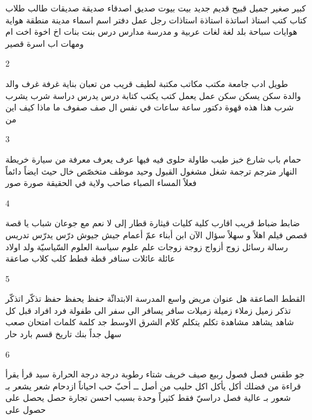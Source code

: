 \documentclass[twocolumn,a4paper]{article}
\begin{document}
\renewcommand*{\arraystretch}{3}
\setlength\tabcolsep{1pt}
\textarabic{
 كبير  
 صغير  
 جميل  
 قبيح  
 قديم  
 جديد  
 بيت  بيوت  
 صديق  اصدقاء  
 صديقة  صديقات 
 طالب  طلاب  
 كتاب  كتب  
 استاذ  اساتذة  
 استاذة  استاذات 
 رجل  
 عمل  
 دفتر  
 اسم  اسماء  
 مدينة  
 منطقة  
 هواية  هوايات 
 سباحة  
 بلد  
 لغة  لغات 
 عربية  
 و  
 مدرسة  مدارس  
 درس  
 بنت  بنات  
 اخ  اخوة  
 اخت  
 ام  ومهات 
 اب  
 اسرة  
 قصير  
}

2

\textarabic{ طويل  
 ادب  
 جامعة  
 مكتب  مكاتب  
 مكتبة  
 لطيف  
 قريب من  
 تعبان  
 بناية  
 غرفة  غرف  
 والد 
 والدة  
 سكن  يسكن  
 سكن  
 عمل  يعمل  
 كتب  يكتب  
 كتابة  
 درس  يدرس  
 دراسة  
 شرب  يشرب  
 شرب  
 هذا  
 هذه  
 قهوة  
 دكتور  
 ساعة  ساعات 
 في  
 نفس ال  
 صف  صفوف  
 ما  
 ماذا  
 كيف  
 اين  
 من  
}

3

\textarabic{ حمام  
 باب  
 شارع  
 خبز  
 طيب  
 طاولة  
 حلوى  
 فيه   
 فيها  
 عرف  يعرف   
 معرفة  
 من  
 سيارة  
 خريطة  
 النهار  
 مترجم  
 ترجمة  
 شغل  
 مشغول  
 القبول  
 وحيد  
 موظف  
 متخصّص  
 خال  
 حيث  
 ايضاً  
 دائماً  
 فعلاً  
 المساء  
 الصباء  
 صاحب  
 وﻻية  
 في الحقيقة  
 صورة  صور  
}

4

\textarabic{ ضابط  ضباط  
 قريب  اقارب  
 كلية  كليات  
 قيثارة  
 قطار  
 إلى  
 لا  
 نعم  
 مع  
 جوعان  
 شباب  
 يا  
 قصة  قصص  
 فيلم  
 اهلاً و سهلاً  
 سؤال  
 اﻵن  
 ابن  أبناء  
 عمّ  أعمام  
 جيش  جيوش  
 درّس  يدرّس  
 تدريس  
 رسالة  رسائل  
 زوج  أزواج  
 زوجة  زوجات 
 علم  علوم  
 سياسة  
 العلوم السّياسيّة  
 ولد  اولاد  
 عائلة  عائلات 
 سنافر  
 قطة  قطط  
 كلب  كلاب   
 صاعقة  
}

5

\textarabic{ القطط الصاعقة  
 هل  
 عنوان  
 مريض  
 واسع  
 المدرسة الابتدائّة  
 حفظ  يحفظ  
 حفظ  
 تذكّر  اتذكّر  
 تذكر  
 زميل  زملاء  
 زميلة  زميلات 
 سافر  يسافر الى  
 سفر الى  
 طفولة  
 فرد  افراد  
 قبل  
 كل  
 شاهد  يشاهد  
 مشاهدة  
 تكلم  يتكلم  
 كلام  
 الشرق الاوسط  
 جد  
 كلمة  كلمات 
 امتحان  
 صعب  
 سهل  
 جداً  
 بنك  
 تاريخ  
 قسم  
 بارد  
 حار  
}

6

\textarabic{ جو  
 طقس  
 فصل  فصول  
 ربيع  
 صيف  
 خريف  
 شتاء  
 رطوبة  
 درجة  
 درجة الحرارة  
 سيد  
 قرأ  يقرأ  
 قراءة  
 من فضلك  
 أكل  يأكل  
 اكل  
 حليب  
 من أصل  
 ــ  أحبّ  
 حب  
 احياناً  
 ازدحام  
 شعر  يشعر بـ  
 شعور بـ  
 عالية  
 فصل دراسيّ  
 فقط  
 كثيراً  
 وحدة  
 بسبب  
 احسن  
 تجارة  
 حصل  يحصل على  
 حصول على  
}
\end{document}
